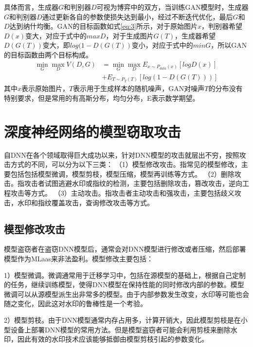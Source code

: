 具体而言，生成器$G$和判别器$D$可视为博弈中的双方，当训练GAN模型时，生成器$G$和判别器$D$通过更新各自的参数使损失达到最小，经过不断迭代优化，最后$G$和$D$达到纳什均衡。GAN的目标函数如式\ref{eq:3}所示，对于原始图片$x$，判别器希望$D(x)$变大，对应于式中的$maxD$，对于生成图片$G(T)$，生成器希望$D(G(T))$变大，即$log(1 - D(G(T))$变小，对应于式中的$minG$，所以GAN的目标函数由两个目标构成。
\begin{equation}
	\label{eq:3}
	\begin{split}
		\mathop{min} \limits_{G} \mathop{max} \limits_{D} V(D, G) &= \mathop{min} \limits_{G} \mathop{max} \limits_{D} E_{x \sim P_{data}(x)}[logD(x)] \\
		&+ E_{T \sim P_{T}(T)}[log(1 - D(G(T)))]
	\end{split}
\end{equation}
其中$x$表示原始图片，$T$表示用于生成样本的随机噪声，GAN对噪声$T$的分布没有特别要求，但是常用的有高斯分布，均匀分布，E表示数学期望。

\section{深度神经网络的模型窃取攻击}

自DNN在各个领域取得巨大成功以来，针对DNN模型的攻击就层出不穷，按照攻击方式的不同，可以分为以下三类\cite{xue2021intellectual}：
（1）模型修改攻击。指常见的模型修改，主要包括包括模型微调，模型剪枝，模型压缩，模型再训练等方式。
（2）删除攻击。指攻击者试图逃避水印或指纹的检测，主要包括删除攻击，篡改攻击，逆向工程攻击等方式。
（3）主动攻击。指攻击者主动攻击和强攻击，主要包括歧义攻击，水印和指纹覆盖攻击，查询修改攻击等方式。

\subsection{模型修改攻击}

模型盗窃者在盗窃DNN模型后，通常会对DNN模型进行修改或者压缩，然后部署模型作为MLaas来非法盈利。模型修改主要包括：

1）模型微调。微调通常用于迁移学习中，包括在源模型的基础上，根据自己定制的任务，继续训练模型，使得DNN模型在保持性能的同时修改内部的参数。模型微调可以从源模型派生出非常多的模型。由于内部参数发生改变，水印等可能也会随之变化，因此这对水印的鲁棒性是一个考验。
	
2）模型剪枝。由于DNN模型通常内存占用多，计算开销大，因此模型剪枝是在小型设备上部署DNN模型的常用方法。但是模型盗窃者可能会利用剪枝来删除水印，因此有效的水印技术应该能够抵御由模型剪枝引起的参数变化。
	
